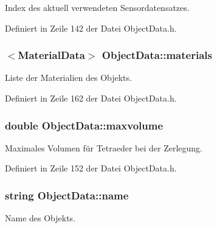 Index des aktuell verwendeten Sensordatensatzes. 



Definiert in Zeile 142 der Datei Object\-Data.\-h.

\hypertarget{classObjectData_a353002eeb054efed800db1b798d08a6c}{
\subsubsection[{materials}]{$<${\bf Material\-Data}$>$ Object\-Data\-::materials\hspace{0.3cm}{\ttfamily [private]}}}\label{classObjectData_a353002eeb054efed800db1b798d08a6c}


Liste der Materialien des Objekts. 



Definiert in Zeile 162 der Datei Object\-Data.\-h.

\hypertarget{classObjectData_a5cc67da17022ec0f6eed6d02fa975a8b}{
\subsubsection[{maxvolume}]{\setlength{\rightskip}{0pt plus 5cm}double Object\-Data\-::maxvolume\hspace{0.3cm}{\ttfamily [private]}}}\label{classObjectData_a5cc67da17022ec0f6eed6d02fa975a8b}


Maximales Volumen für Tetraeder bei der Zerlegung. 



Definiert in Zeile 152 der Datei Object\-Data.\-h.

\hypertarget{classObjectData_a6d900f11952e9d50e6660a3695fad99d}{
\subsubsection[{name}]{\setlength{\rightskip}{0pt plus 5cm}string Object\-Data\-::name\hspace{0.3cm}{\ttfamily [private]}}}\label{classObjectData_a6d900f11952e9d50e6660a3695fad99d}


Name des Objekts. 



